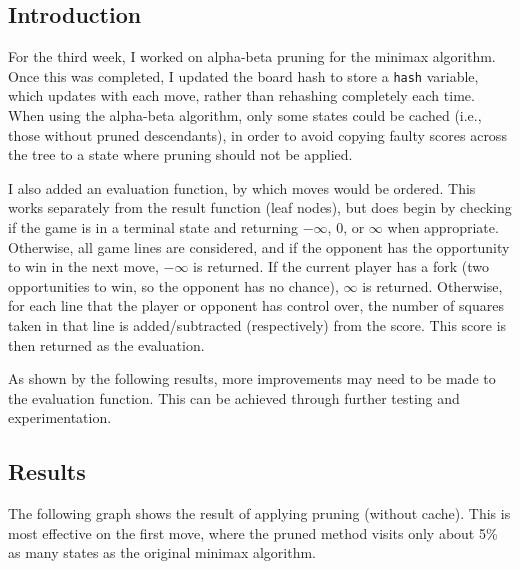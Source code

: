 \documentclass[12pt]{article}
\begin{document}
\subsection*{Introduction}
For the third week, I worked on alpha-beta pruning for the minimax algorithm. Once this was completed, I updated the board hash to store a \texttt{hash} variable, which updates with each move, rather than rehashing completely each time. When using the alpha-beta algorithm, only some states could be cached (i.e., those without pruned descendants), in order to avoid copying faulty scores across the tree to a state where pruning should not be applied.

I also added an evaluation function, by which moves would be ordered. This works separately from the result function (leaf nodes), but does begin by checking if the game is in a terminal state and returning \(-\infty\), \(0\), or \(\infty\) when appropriate. Otherwise, all game lines are considered, and if the opponent has the opportunity to win in the next move, \(-\infty\) is returned. If the current player has a fork (two opportunities to win, so the opponent has no chance), \(\infty\) is returned. Otherwise, for each line that the player or opponent has control over, the number of squares taken in that line is added/subtracted (respectively) from the score. This score is then returned as the evaluation.

As shown by the following results, more improvements may need to be made to the evaluation function. This can be achieved through further testing and experimentation. 

\subsection*{Results}

The following graph shows the result of applying pruning (without cache). This is most effective on the first move, where the pruned method visits only about 5\% as many states as the original minimax algorithm.
\end{document}
